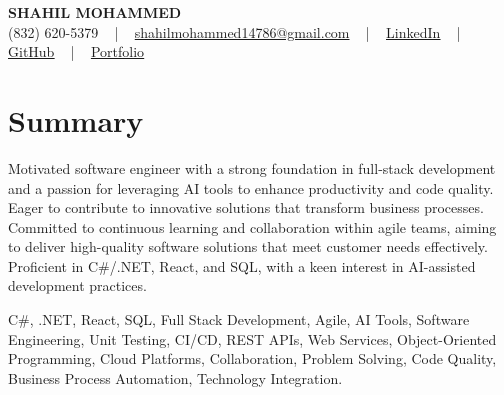 \documentclass[letterpaper,10pt]{article}
\begin{document}
\begin{center}
    {\fontsize{14pt}{12pt}\selectfont \textbf{\MakeUppercase{Shahil Mohammed}}}\\ \vspace{2pt}
    \fontsize{10pt}{12pt}\selectfont (832) 620-5379 ~ | ~ \href{mailto:shahilmohammed14786@gmail.com}{shahilmohammed14786@gmail.com} ~ | ~  
    \href{https://www.linkedin.com/in/shahil-mohammed-9652931a1/}{\color{blue}\underline{LinkedIn}}  ~ | ~ 
    \href{https://github.com/freakbeast14}{\color{blue}\underline{GitHub}} ~ | ~ 
    \href{https://shahil-mohammed.netlify.app/}{\color{blue}\underline{Portfolio}}
    \vspace{-8pt}
\end{center}

\section{Summary}
\vspace{-2pt}\fontsize{8pt}{9pt}\selectfont
Motivated software engineer with a strong foundation in full-stack development and a passion for leveraging AI tools to enhance productivity and code quality. Eager to contribute to innovative solutions that transform business processes. Committed to continuous learning and collaboration within agile teams, aiming to deliver high-quality software solutions that meet customer needs effectively. Proficient in C#/.NET, React, and SQL, with a keen interest in AI-assisted development practices. 
\vspace{-5pt}
 
{\fontsize{1pt}{1pt}\selectfont\color{white}
C#, .NET, React, SQL, Full Stack Development, Agile, AI Tools, Software Engineering, Unit Testing, CI/CD, REST APIs, Web Services, Object-Oriented Programming, Cloud Platforms, Collaboration, Problem Solving, Code Quality, Business Process Automation, Technology Integration.
}
\vspace{-8pt}

\vspace{-2pt}
\end{document}
